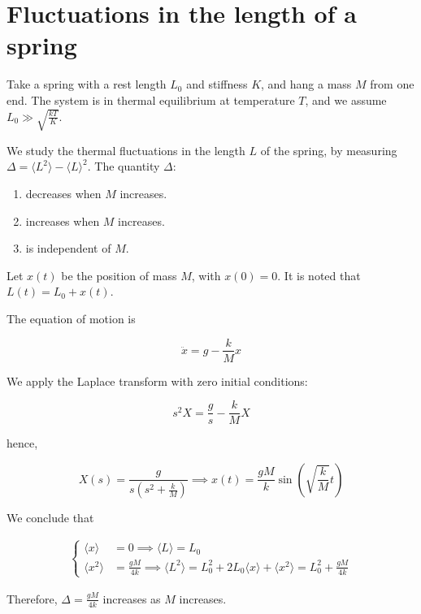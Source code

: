 \documentclass[english]{article}
\begin{document}
	\section{Fluctuations in the length of a spring}
	\begin{tcolorbox}[colback=blue!5!white,colframe=blue!75!black]
		\quad Take a spring with a rest length $L_0$ and stiffness $K$, and hang a mass $M$ from one end. The system is in thermal equilibrium at temperature $T$, and we assume $L_0 \gg \sqrt{\frac{kT}{K}}$.
		
		\quad We study the thermal fluctuations in the length $L$ of the spring, by measuring $\Delta = \langle L^2 \rangle - \langle L \rangle^2$. The quantity $\Delta$:
		\begin{enumerate}
			\item decreases when $M$ increases.
			\item increases when $M$ increases.
			\item is independent of $M$.
		\end{enumerate}
	\end{tcolorbox}

	Let \( x(t) \) be the position of mass \( M \), with \( x(0) = 0 \). It is noted that \( L(t) = L_0 + x(t) \).
	
	The equation of motion is
	
	\[ \ddot{x} = g - \frac{k}{M} x \]
	
	We apply the Laplace transform with zero initial conditions:
	
	\[ s^2 X = \frac{g}{s} - \frac{k}{M}X \]
	
	hence,
	
	\[ X(s) = \frac{g}{s \left( s^2 + \frac{k}{M} \right)} \implies x(t) = \frac{gM}{k} \sin\left( \sqrt{\frac{k}{M}} t \right) \]
	
	We conclude that
	
	\begin{align}
	\begin{cases}
	\langle x \rangle &= 0 \implies \langle L \rangle = L_0 \\
	\langle x^2 \rangle &= \frac{gM}{4k} \implies \langle L^2 \rangle = L_0^2 + 2L_0 \langle x \rangle + \langle x^2 \rangle = L_0^2 + \frac{gM}{4k}
	\end{cases}
	\end{align}
	
	Therefore, \( \Delta = \frac{gM}{4k} \) increases as \( M \) increases.
	
	
\end{document}
